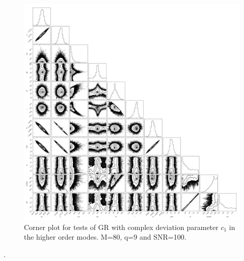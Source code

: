 \documentclass[prd,preprintnumbers,twocolumn,eqsecnum,floatfix,a4paper,nofootinbib,superscriptaddress]{revtex4}
\begin{document}
\begin{figure}[tbh]
\begin{center}
\includegraphics[scale=0.25]{figs/c1_80_9_100_corner_plot_wo_burnin.png} 
\end{center} 
\caption{Corner plot for tests of GR with complex deviation parameter $c_1$ in the higher order modes. M=80, q=9 and SNR=100.}
\label{fig:c1_corner}
\end{figure}

\newpage
.
\newpage 
\end{document}
